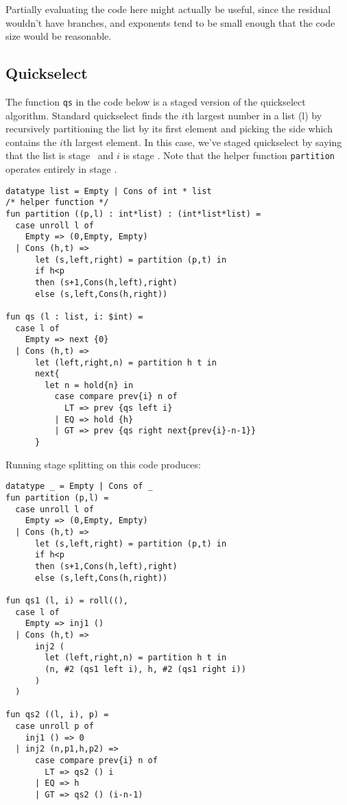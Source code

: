 Partially evaluating the code here might actually be useful, since the residual wouldn't have branches,
and exponents tend to be small enough that the code size would be reasonable.

\subsection{Quickselect}

The function {\tt qs} in the code below is a staged version of the quickselect algorithm.
Standard quickselect finds the $i$th largest number in a list (l) by recursively partitioning the list by its 
first element and picking the side which contains the $i$th largest element.
In this case, we've staged quickselect by saying that the list is stage \bbone\ and $i$ is stage \bbtwo.
Note that the helper function {\tt partition} operates entirely in stage \bbone.

\begin{lstlisting} 
datatype list = Empty | Cons of int * list
/* helper function */
fun partition ((p,l) : int*list) : (int*list*list) =
  case unroll l of 
    Empty => (0,Empty, Empty) 
  | Cons (h,t) =>
      let (s,left,right) = partition (p,t) in
      if h<p 
      then (s+1,Cons(h,left),right)
      else (s,left,Cons(h,right))

fun qs (l : list, i: $int) = 
  case l of
    Empty => next {0}
  | Cons (h,t) => 
      let (left,right,n) = partition h t in
      next{
        let n = hold{n} in
          case compare prev{i} n of
            LT => prev {qs left i}
          | EQ => hold {h}
          | GT => prev {qs right next{prev{i}-n-1}}
      }	
\end{lstlisting}

\noindent
Running stage splitting on this code produces:

\begin{lstlisting} 
datatype _ = Empty | Cons of _
fun partition (p,l) =
  case unroll l of 
    Empty => (0,Empty, Empty) 
  | Cons (h,t) =>
      let (s,left,right) = partition (p,t) in
      if h<p 
      then (s+1,Cons(h,left),right)
      else (s,left,Cons(h,right))

fun qs1 (l, i) = roll((), 
  case l of
    Empty => inj1 ()
  | Cons (h,t) => 
      inj2 (
        let (left,right,n) = partition h t in
        (n, #2 (qs1 left i), h, #2 (qs1 right i))
      )
  )

fun qs2 ((l, i), p) = 
  case unroll p of
    inj1 () => 0
  | inj2 (n,p1,h,p2) => 
      case compare prev{i} n of
        LT => qs2 () i
      | EQ => h
      | GT => qs2 () (i-n-1)
\end{lstlisting}

